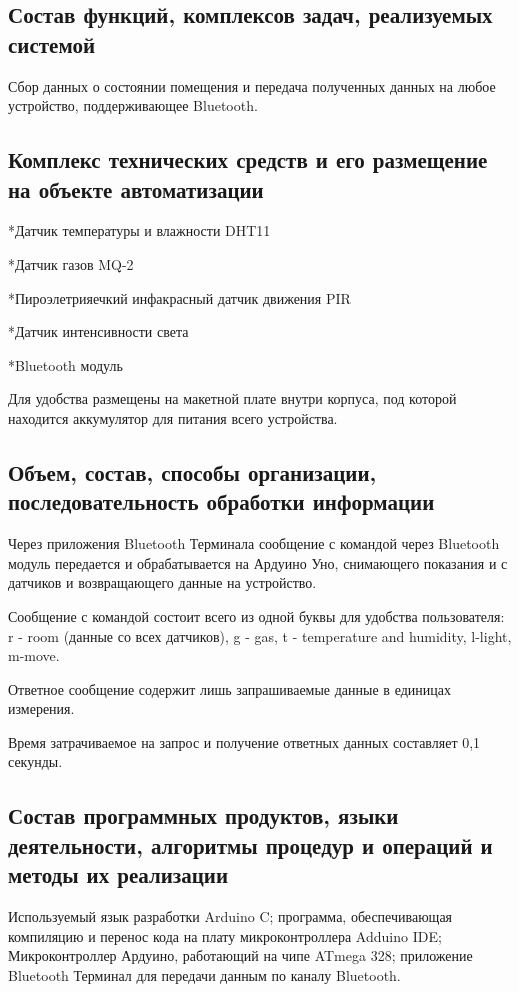 \documentclass[12pt,a4paper]{scrartcl}
\begin{document}
 		\subsection{Состав функций, комплексов задач, реализуемых системой }
 	Сбор данных о состоянии помещения и передача полученных данных на любое устройство, поддерживающее Bluetooth.
 	
 		\subsection{Комплекс технических средств и его размещение на объекте автоматизации}
 	
 	*Датчик температуры и влажности DHT11
 	
 	*Датчик газов MQ-2
 	
 	*Пироэлетрияечкий инфакрасный датчик движения PIR
 	
 	*Датчик интенсивности света
 	
 	*Bluetooth модуль
 	
 	Для удобства размещены на макетной плате внутри корпуса, под которой находится аккумулятор для питания всего устройства.
 	
 		\subsection{Объем, состав, способы организации, последовательность обработки информации}
 	Через приложения Bluetooth Терминала сообщение с командой через Bluetooth модуль передается и обрабатывается на Ардуино Уно, снимающего показания и с датчиков и возвращающего данные на устройство.
 	
 	Сообщение с командой состоит всего из одной буквы для удобства пользователя:
 	r - room (данные со всех датчиков), g - gas, t - temperature and humidity, l-light, m-move.
 	
 	Ответное сообщение содержит лишь запрашиваемые данные в единицах измерения.
 	
 	Время затрачиваемое на запрос и получение ответных данных составляет 0,1 секунды.
 		\subsection{Состав программных продуктов, языки деятельности, алгоритмы процедур и операций и методы их реализации}
 	Используемый язык разработки Arduino C; программа, обеспечивающая компиляцию и перенос кода на плату микроконтроллера Adduino IDE; Микроконтроллер Ардуино, работающий на чипе  ATmega 328; приложение Bluetooth Терминал для передачи данным по каналу  Bluetooth. 
 	
\end{document}
